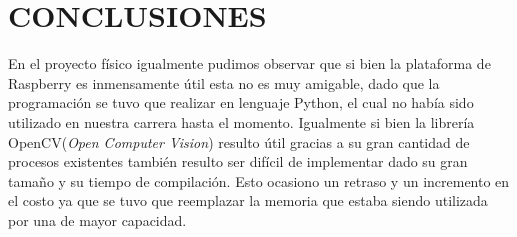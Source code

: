 
\newpage
{} 

%
%

\section*{CONCLUSIONES}
En el proyecto físico igualmente pudimos observar que si bien la plataforma de Raspberry es inmensamente útil esta no es muy amigable, dado que la programación se tuvo que realizar en lenguaje Python, el cual no había sido utilizado en nuestra carrera hasta el momento. Igualmente si bien la librería OpenCV(\textit{Open Computer Vision}) resulto útil gracias a su gran cantidad de procesos existentes también resulto ser difícil de implementar dado su gran tamaño y su tiempo de compilación. Esto ocasiono un retraso y un incremento en el costo ya que se tuvo que reemplazar la memoria que estaba siendo utilizada por una de mayor capacidad.